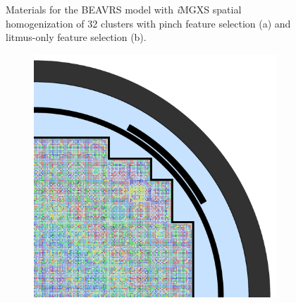 \begin{figure}[h!]
\begin{subfigure}{0.67\textwidth}
  \caption{}
  \label{fig:chap10-full-core-combined-32}
\end{subfigure}
\caption[Materials for BEAVRS with \textit{i}\ac{MGXS} homogenization (32 clusters)]{Materials for the \ac{BEAVRS} model with \textit{i}\ac{MGXS} spatial homogenization of 32 clusters with pinch feature selection (a) and litmus-only feature selection (b).}
\label{fig:chap10-full-core-geometries-32}
\end{figure}

\clearpage

\begin{figure}[h!]
\centering
\begin{subfigure}{0.67\textwidth}
  \centering
  \includegraphics[width=\linewidth]{figures/unsupervised/geometries/with-features/64-clusters/pinch/full-core}
  \caption{}
  \label{fig:chap10-full-core-pinch-64}
\end{subfigure}
\begin{subfigure}{0.67\textwidth}
  \centering

\end{subfigure}
\end{figure}
